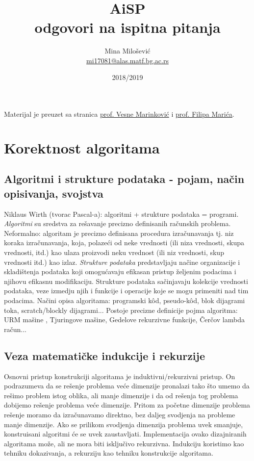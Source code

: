 \documentclass{article}
\title{AiSP \\ odgovori na ispitna pitanja}
\author{Mina Milošević \\
\href{mailto:mi17081@alas.matf.bg.ac.rs}{mi17081@alas.matf.bg.ac.rs}}
\date{2018/2019}
\begin{document}
\maketitle

\vspace{10cm}
Materijal je preuzet sa stranica \href{http://poincare.matf.bg.ac.rs/~vesnap/asp.html}{prof. Vesne Marinković} i \href{http://poincare.matf.bg.ac.rs/~filip/asp/}{prof. Filipa Marića}.

\newpage
\renewcommand*\contentsname{Sadržaj}
\tableofcontents
\newpage
\section{Korektnost algoritama}
\subsection{Algoritmi i strukture podataka - pojam, način opisivanja, svojstva}
Niklaus Wirth (tvorac Pascal-a): algoritmi + strukture podataka = programi. \textit{Algoritmi} su sredstva za rešavanje precizno definisanih računskih problema.
\newline Neformalno: algoritam je precizno definisana procedura izračunavanja tj. niz koraka izračunavanja, koja, polazeći od neke vrednosti (ili niza vrednosti, skupa vrednosti, itd.) kao ulaza proizvodi neku vrednost (ili niz vrednosti, skup vrednosti itd.) kao izlaz.
\newline \textit{Strukture podataka} predstavljaju načine organizacije i skladištenja podataka koji omogućavaju efikasan pristup željenim podacima i njihovu efikasnu modifikaciju. Strukture podataka sačinjavaju kolekcije vrednosti podataka, veze izmedju njih i funkcije i operacije koje se mogu primeniti nad tim 
podacima.
Načini opisa algoritama: programski kôd, pseudo-kôd, blok dijagrami toka, scratch/blockly dijagrami...
Postoje precizne definicije pojma algoritma: URM mašine , Tjuringove mašine, Gedelove rekurzivne funkcije, Čerčov lambda račun...

\subsection{Veza matematičke indukcije i rekurzije}
Osnovni pristup konstrukciji algoritama je induktivni/rekurzivni pristup. On podrazumeva da se rešenje problema veće dimenzije pronalazi tako što umemo da rešimo problem istog oblika, ali manje dimenzije i da od rešenja tog problema dobijemo rešenje problema veće dimenzije. Pritom za početne dimenzije problema rešenje moramo da izračunavamo direktno, bez daljeg svodjenja na probleme manje dimenzije. Ako se prilikom svodjenja dimenzija problema uvek smanjuje, 
konstruisani algoritmi će se uvek zaustavljati. Implementacija ovako dizajniranih algoritama može, ali ne mora biti isključivo rekurzivna. Indukciju koristimo kao tehniku dokazivanja, a rekurziju kao tehniku konstrukcije algoritama.
\end{document}
